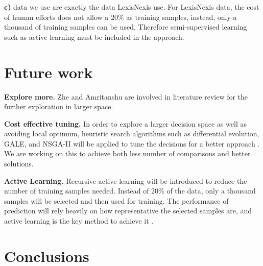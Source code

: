 \documentclass{sig-alternate-05-2015}
\begin{document}
\textbf{c)} data we use are exactly the data LexisNexis use. For LexisNexis data, the cost of human efforts does not allow a $20\%$ as  training samples, instead, only a thousand of training samples can be used. Therefore semi-supervised learning such as active learning must be included in the approach.


\section{Future work}


\textbf{Explore more.} Zhe and Amritanshu are involved in literature review for the further exploration in larger space.

\textbf{Cost effective tuning.} In order to explore a larger decision space as well as avoiding local optimum, heuristic search algorithms such as differential evolution, GALE, and NSGA-II will be applied to tune the decisions for a better approach \cite{storn1997differential,krall2015gale,deb2002fast}. We are working on this to achieve both less number of comparisons and better solutions.

\textbf{Active Learning.} Recursive active learning will be introduced to reduce the number of training samples needed. Instead of 20\% of the data, only a thousand samples will be selected and then used for training. The performance of prediction will rely heavily on how representative the selected samples are, and active learning is the key method to achieve it \cite{tong2002support}.





\section{Conclusions}
\label{sect:Conclusions}






 

%
 \renewcommand{\baselinestretch}{0.9}

\small

\balance
\renewcommand{\baselinestretch}{1}

%
%
\end{document}
